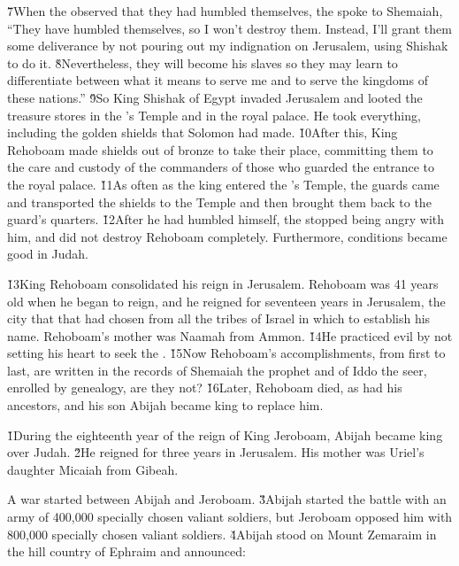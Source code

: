 \v{7}When the  observed that they had humbled themselves, the  spoke to Shemaiah, ``They have humbled themselves, so I won't destroy them. Instead, I'll grant them some deliverance by not pouring out my indignation on Jerusalem, using Shishak to do it. \v{8}Nevertheless, they will become his slaves so they may learn to differentiate between what it means to serve me and to serve the kingdoms of these nations.'' \v{9}So King Shishak of Egypt invaded Jerusalem and looted the treasure stores in the 's Temple and in the royal palace. He took everything, including the golden shields that Solomon had made. \v{10}After this, King Rehoboam made shields out of bronze to take their place, committing them to the care and custody of the commanders of those who guarded the entrance to the royal palace. \v{11}As often as the king entered the 's Temple, the guards came and transported the shields to the Temple and then brought them back to the guard's quarters. \v{12}After he had humbled himself, the  stopped being angry with him, and did not destroy Rehoboam completely. Furthermore, conditions became good in Judah.

\v{13}King Rehoboam consolidated his reign in Jerusalem. Rehoboam was 41 years old when he began to reign, and he reigned for seventeen years in Jerusalem, the city that that  had chosen from all the tribes of Israel in which to establish his name. Rehoboam's mother was Naamah from Ammon. \v{14}He practiced evil by not setting his heart to seek the . \v{15}Now Rehoboam's accomplishments, from first to last, are written in the records of Shemaiah the prophet and of Iddo the seer, enrolled by genealogy, are they not? \v{16}Later, Rehoboam died, as had his ancestors, and his son Abijah became king to replace him.

\v{1}During the eighteenth year of the reign of King Jeroboam, Abijah became king over Judah. \v{2}He reigned for three years in Jerusalem. His mother was Uriel's daughter Micaiah from Gibeah.

A war started between Abijah and Jeroboam. \v{3}Abijah started the battle with an army of 400,000 specially chosen valiant soldiers, but Jeroboam opposed him with 800,000 specially chosen valiant soldiers. \v{4}Abijah stood on Mount Zemaraim in the hill country of Ephraim and announced:


